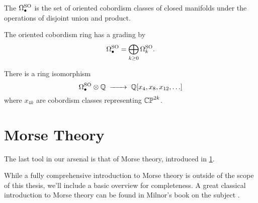 \begin{definition}
	The  $\Omega^{\mathrm{SO}}_\bullet$ is the set of oriented cobordism classes of closed manifolds under the operations of disjoint union and product.
\end{definition}

The oriented cobordism ring has a grading by
\[
	\Omega_\bullet^{\mathrm{SO}} = \bigoplus_{k\geq 0} \Omega^{\mathrm{SO}}_k.
\]

\begin{theorem}\label{thm:oriented-cobordism-structure}
	There is a ring isomorphism
	\[
		\Omega_\bullet^\SO \otimes \Q \lkxto \Q[x_4, x_8, x_{12}, \ldots]
	\]
	where $x_{4k}$ are cobordism classes representing $\mathbb{CP}^{2k}$.
\end{theorem}

\pagebreak
\section{Morse Theory}\label{sec:morse-theory}

The last tool in our arsenal is that of Morse theory, introduced in \cref{sec:morse-theory}.


While a fully comprehensive introduction to Morse theory is outside of the scope of this thesis, we'll include a basic overview for completeness. A great classical introduction to Morse theory can be found in Milnor's book on the subject \cite{milnor1963morse}.


